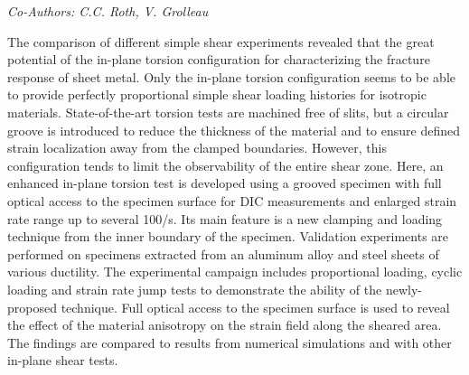 \begin{center}
\textit{Co-Authors: C.C. Roth, V. Grolleau}
\end{center} 
The comparison of different simple shear experiments revealed that the great potential of the in-plane torsion configuration for characterizing the fracture response of sheet metal. Only the in-plane torsion configuration seems to be able to provide perfectly proportional simple shear loading histories for isotropic materials. State-of-the-art torsion tests are machined free of slits, but a circular groove is introduced to reduce the thickness of the material and to ensure defined strain localization away from the clamped boundaries. However, this configuration tends to limit the observability of the entire shear zone. Here, an enhanced in-plane torsion test is developed using a grooved specimen with full optical access to the specimen surface for DIC measurements and enlarged strain rate range up to several 100/s. Its main feature is a new clamping and loading technique from the inner boundary of the specimen. Validation experiments are performed on specimens extracted from an aluminum alloy and steel sheets of various ductility. The experimental campaign includes proportional loading, cyclic loading and strain rate jump tests to demonstrate the ability of the newly-proposed technique. Full optical access to the specimen surface is used to reveal the effect of the material anisotropy on the strain field along the sheared area. The findings are compared to results from numerical simulations and with other in-plane shear tests.
